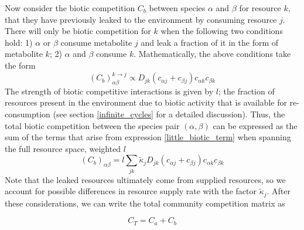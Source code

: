 \documentclass[12pt]{article}
\begin{document}
            Now consider the biotic competition $C_b$ between species $\alpha$ and $\beta$ for resource $k$, that they have previously leaked to the environment by consuming resource $j$. There will only be biotic competition for $k$ when the following two conditions hold: 1) $\alpha$ or $\beta$ consume metabolite $j$ and leak a fraction of it in the form of metabolite $k$; 2) $\alpha$ and $\beta$ consume $k$. Mathematically, the above conditions take the form
            \begin{equation}\label{little_biotic_term}
                (C_b)^{k\rightarrow j}_{\alpha \beta} \propto D_{jk}\left(c_{\alpha j} + c_{\beta j}\right)c_{\alpha k}c_{\beta k}
            \end{equation}
            The strength of biotic competitive interactions is given by $l$; the fraction of resources present in the environment due to biotic activity that is available for re-consumption (see section \ref{infinite_cycles} for a detailed discussion). Thus, the total biotic competition between the species pair $(\alpha, \beta)$ can be expressed as the sum of the terms that arise from expression \ref{little_biotic_term} when spanning the full resource space, weighted $l$
            \begin{equation}\label{biotic}
        		(C_b)_{\alpha\beta} = l \sum_{jk} \tilde{\kappa}_jD_{jk}\left(c_{\alpha j} + c_{\beta j}\right)c_{\alpha k}c_{\beta k}
        	\end{equation}
        	Note that the leaked resources ultimately come from supplied resources, so we account for possible differences in resource supply rate with the factor $\tilde{\kappa}_j$. After these considerations, we can write the total community competition matrix as \par
            \begin{equation}\label{competition}
                C_T = C_a + C_b
            \end{equation}
            
\end{document}
